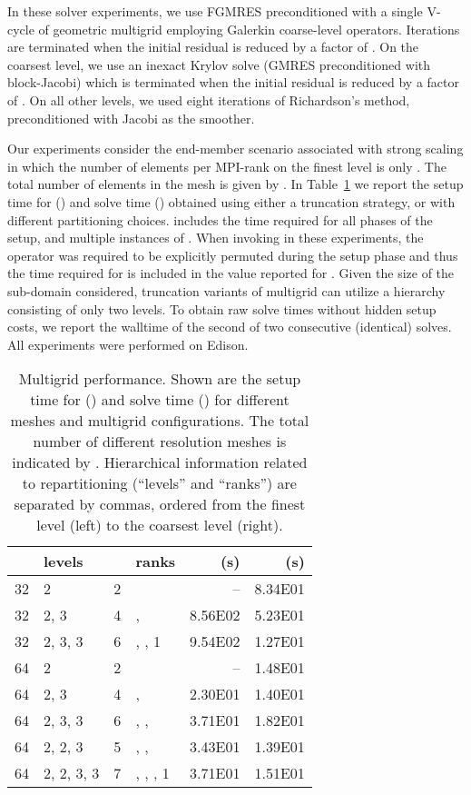 \documentclass[]{siamart0216}
\begin{document}
In these solver experiments, we use FGMRES preconditioned with a single V-cycle of geometric multigrid 
employing Galerkin coarse-level operators. Iterations are terminated when the initial residual is reduced by a factor of .
On the coarsest level, we use an inexact Krylov solve (GMRES preconditioned with block-Jacobi) which is terminated when the initial residual  
is reduced by a factor of . On all other levels, we used eight iterations of Richardson's method, preconditioned  
with Jacobi as the smoother. 

Our experiments consider the end-member scenario associated with strong scaling in which the 
number of elements per MPI-rank on the finest level is only . The total number of elements in the mesh is 
given by .
In Table~\ref{tab:telescopeMG} we report the setup time for  () and 
solve time () obtained using either a truncation strategy, 
or  with different partitioning choices.
 includes the time required for all phases of the setup, and multiple instances of .
When invoking  in these experiments, the 
operator was required to be explicitly permuted during the setup phase and thus the time required for  
is included in the value reported for . 
Given the size of the sub-domain considered, truncation variants of multigrid can utilize a hierarchy consisting of only two levels.
To obtain raw solve times without hidden setup costs, 
we report the walltime of the second of two consecutive (identical) solves.
All experiments were performed on Edison. 
\begin{table}[h!]
\centering
\caption{Multigrid performance. 
Shown are the setup time for  () and solve time () for
different meshes and multigrid configurations. 
The total number of different resolution meshes is indicated by .
Hierarchical information related to repartitioning (``levels'' and ``ranks'') are separated by commas, 
ordered from the finest level (left) to the coarsest level (right).
}
\begin{tabular}{l l c l r r}
\toprule
    &levels   &  &ranks  & (s) & (s)\\
\toprule
32 &2          &2 &                       &--   &8.34E01 \\ 32 &2, 3      &4 &,            &8.56E02   &5.23E01 \\ 32 &2, 3, 3  &6 &, , 1       &9.54E02   &1.27E01 \\ \midrule
64 &2          &2  &                    &--                   &1.48E01 \\ 64 &2, 3      &4  &,             &2.30E01                       &1.40E01 \\ 64 &2, 3, 3  &6  &, ,         &3.71E01   &1.82E01 \\ 64 &2, 2, 3  &5  &, ,     &3.43E01   &1.39E01 \\ 64 &2, 2, 3, 3 &7 &, , , 1 &3.71E01 &1.51E01 \\ \bottomrule
\end{tabular}
\label{tab:telescopeMG}
\end{table}
\end{document}
